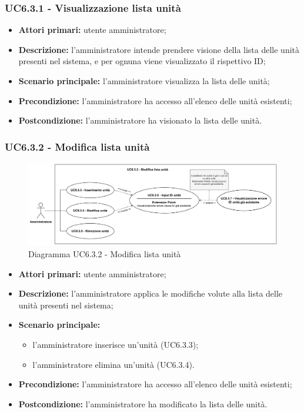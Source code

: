 \subsubsection{UC6.3.1 - Visualizzazione lista unità}
\begin{itemize}
	\item \textbf{Attori primari:} utente amministratore;
	\item \textbf{Descrizione:} l'amministratore intende prendere visione della lista delle unità presenti nel sistema, e per ognuna viene visualizzato il rispettivo ID;
	\item \textbf{Scenario principale:} l'amministratore visualizza la lista delle unità;
	\item \textbf{Precondizione:} l'amministratore ha accesso all'elenco delle unità esistenti;
	\item \textbf{Postcondizione:} l'amministratore ha visionato la lista delle unità.
\end{itemize}

\subsubsection{UC6.3.2 - Modifica lista unità}
	\begin{figure}[H]
		\centering
		\includegraphics[width=17cm]{images/UC6.3.2.png}
		\caption{Diagramma UC6.3.2 - Modifica lista unità}
	\end{figure}
	\begin{itemize}
		\item \textbf{Attori primari:} utente amministratore;
		\item \textbf{Descrizione:} l'amministratore applica le modifiche volute alla lista delle unità presenti nel sistema;
		\item \textbf{Scenario principale:} 
		\begin{itemize}
			\item l'amministratore inserisce un'unità (UC6.3.3);
			\item l'amministratore elimina un'unità (UC6.3.4).
		\end{itemize}
		\item \textbf{Precondizione:} l'amministratore ha accesso all'elenco delle unità esistenti;
		\item \textbf{Postcondizione:} l'amministratore ha modificato la lista delle unità.
	\end{itemize}

